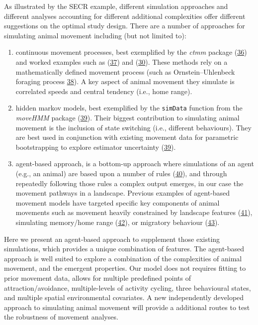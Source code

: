 \documentclass[10pt,a4paper]{article}
\begin{document}
As illustrated by the SECR example, different simulation approaches and different analyses accounting for different additional complexities offer different suggestions on the optimal study design.
There are a number of approaches for simulating animal movement including (but not limited to):

\begin{enumerate}
\def\labelenumi{\arabic{enumi}.}
\item
  continuous movement processes, best exemplified by the \emph{ctmm} package (\protect\hyperlink{ref-Calabrese2016}{36}) and worked examples such as (\protect\hyperlink{ref-silva_autocorrelationinformed_2022}{37}) and (\protect\hyperlink{ref-theng_confronting_2022}{30}).
  These methods rely on a mathematically defined movement process (such as Ornstein--Uhlenbeck foraging process \protect\hyperlink{ref-Fleming2014}{38}).
  A key aspect of animal movement they simulate is correlated speeds and central tendency (i.e., home range).
\item
  hidden markov models, best exemplified by the \texttt{simData} function from the \emph{moveHMM} package (\protect\hyperlink{ref-Michelot2016}{39}).
  Their biggest contribution to simulating animal movement is the inclusion of state switching (i.e., different behaviours).
  They are best used in conjunction with existing movement data for parametric bootstrapping to explore estimator uncertainty (\protect\hyperlink{ref-Michelot2016}{39}).
\item
  agent-based approach, is a bottom-up approach where simulations of an agent (e.g., an animal) are based upon a number of rules (\protect\hyperlink{ref-Tang2010}{40}), and through repeatedly following those rules a complex output emerges, in our case the movement pathways in a landscape.
  Previous examples of agent-based movement models have targeted specific key components of animal movements such as movement heavily constrained by landscape features (\protect\hyperlink{ref-quaglietta_simriv_2019}{41}), simulating memory/home range (\protect\hyperlink{ref-VanMoorter2009}{42}), or migratory behaviour (\protect\hyperlink{ref-bennett_modelling_2006}{43}).
\end{enumerate}

Here we present an agent-based approach to supplement those existing simulations, which provides a unique combination of features.
The agent-based approach is well suited to explore a combination of the complexities of animal movement, and the emergent properties.
Our model does not requires fitting to prior movement data, allows for multiple predefined points of attraction/avoidance, multiple-levels of activity cycling, three behavioural states, and multiple spatial environmental covariates.
A new independently developed approach to simulating animal movement will provide a additional routes to test the robustness of movement analyses.
\end{document}
